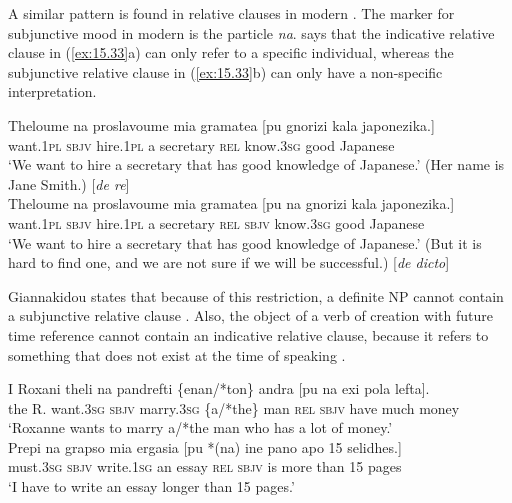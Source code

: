 A similar pattern is found in relative clauses in modern . The marker for subjunctive mood in modern  is the particle \textit{na}. \citet{Giannakidou2011} says that the indicative relative clause in (\ref{ex:15.33}a) can only refer to a specific individual, whereas the subjunctive relative clause in (\ref{ex:15.33}b) can only have a non-specific interpretation.


\ea \label{ex:15.33}
\ea  \gll Theloume  na  proslavoume  mia  gramatea  [pu  gnorizi  kala  japonezika.]\\
want.\textsc{1pl} \textsc{sbjv}  hire.\textsc{1pl} a  secretary  \textsc{rel}  know.\textsc{3sg} good  {Japanese}\\
\glt ‘We want to hire a secretary that has good knowledge of {Japanese}.’ (Her name is Jane Smith.) \hfill  [\textit{de re}] \\
\medskip
\ex \gll  Theloume  na  proslavoume  mia  gramatea [pu  na  gnorizi  kala  japonezika.]\\
want.\textsc{1pl} \textsc{sbjv}  hire.\textsc{1pl} a  secretary \textsc{rel}  \textsc{sbjv}  know.\textsc{3sg} good  {Japanese}\\
\glt ‘We want to hire a secretary that has good knowledge of {Japanese}.’ (But it is hard to find one, and we are not sure if we will be successful.) \hfill  [\textit{de dicto}]\\
\z \z


Giannakidou states that because of this restriction, a definite NP cannot contain a subjunctive relative clause . Also, the object of a verb of creation with future time reference cannot contain an indicative relative clause, because it refers to something that does not exist at the time of speaking .


\ea \label{ex:15.34} 
\gll I  Roxani  theli  na  pandrefti  \{enan/*ton\}  andra [pu  na  exi  pola  lefta]. \\
the  R.  want.\textsc{3sg} \textsc{sbjv}  marry.\textsc{3sg} \{a/*the\}  man  \textsc{rel}  \textsc{sbjv}  have  much  money\\
\glt ‘Roxanne wants to marry a/*the man who has a lot of money.’\\
\ex \label{ex:15.35}
\gll Prepi  na  grapso  mia  ergasia  [pu  *(na)\footnotemark {} ine  pano  apo  15  selidhes.]\\
must.\textsc{3sg} \textsc{sbjv}  write.\textsc{1sg} an  essay  \textsc{rel}  \textsc{sbjv}  is  more  than  15  pages\\
\glt ‘I have to write an essay longer than 15 pages.’\\
\z
{}

